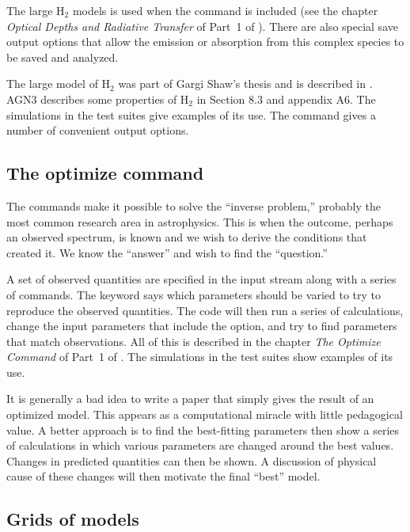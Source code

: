 \documentclass[12pt,twoside]{article}
\begin{document}
{The large H$_2$ models is used when the 
command is included (see the chapter \emph{Optical Depths and Radiative Transfer}
of Part~1 of \Hazy).  There are also special save output options that allow
the emission or absorption from this complex species to be saved and analyzed.

The large model of H$_2$ was part of Gargi Shaw's thesis and is described
in \citet{Shaw2005}.
AGN3 describes some properties of H$_2$ in Section
8.3 and appendix A6.  The simulations 
in the test suites give examples
of its use.  The  command
gives a number of convenient output options.

\subsection{The optimize command}

The  commands make it
possible to solve the ``inverse problem,''
probably the most common research area in astrophysics.  This is when the
outcome, perhaps an observed spectrum, is known and we wish to derive the
conditions that created it.  We know the ``answer'' and wish to find the
``question.''

A set of observed quantities are specified in the input stream along with
a series of  commands.  The
keyword  says which parameters should
be varied to try to reproduce the observed quantities.  The code will then
run a series of calculations, change the input parameters that include the
 option, and try to find parameters
that match observations.
All of
this is described in the chapter \emph{The Optimize Command} of Part~1 of \Hazy.
The simulations  in the
test suites show examples of its use.

It is generally a bad idea to write a paper that simply gives the result
of an optimized model.  This appears as a computational miracle with little
pedagogical value.  A better approach is to find the best-fitting parameters
then show a series of calculations in which various parameters are changed
around the best values.  Changes in predicted quantities can then be shown.
A discussion of physical cause of these changes will then motivate the final
``best'' model.

\subsection{Grids of models}
\label{sec:GridsOfModels}

}
\end{document}
